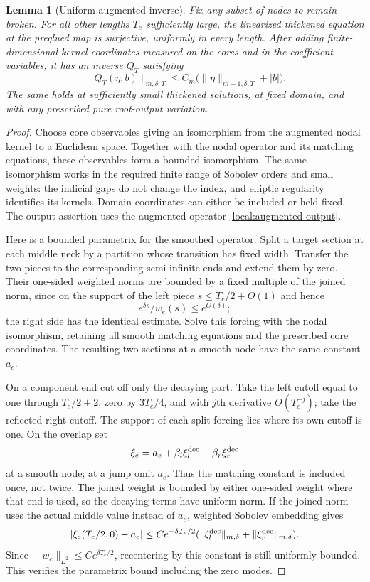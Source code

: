 \documentclass[11pt]{article}
\newtheorem{lemma}[theorem]{Lemma}
\theoremstyle{definition}
\theoremstyle{remark}
\numberwithin{equation}{section}
\begin{document}
\begin{lemma}[Uniform augmented inverse]\label{local:inverse}
Fix any subset of nodes to remain broken.  For all other lengths
$T_e$ sufficiently large, the linearized thickened equation at the
preglued map is surjective, uniformly in every length.  After adding
finite-dimensional kernel coordinates measured on the cores and in
the coefficient variables, it has an inverse $Q_T$ satisfying
\begin{equation}\label{local:inverse-estimate}
 \|Q_T(\eta,b)\|_{m,\delta,T}
       \leq C_m\bigl(\|\eta\|_{m-1,\delta,T}+|b|\bigr).
\end{equation}
The same holds at sufficiently small thickened solutions, at fixed
domain, and with any prescribed pure root-output variation.
\end{lemma}
\begin{proof}
Choose core observables giving an isomorphism from the augmented nodal
kernel to a Euclidean space.  Together with the nodal operator and its
matching equations, these observables form a bounded isomorphism.
The same isomorphism works in the required finite range of Sobolev
orders and small weights: the indicial gaps do not change the index,
and elliptic regularity identifies its kernels.  Domain coordinates
can either be included or held fixed.  The output assertion uses the
augmented operator \eqref{local:augmented-output}.

Here is a bounded parametrix for the smoothed operator.  Split a target
section at each middle neck by a partition whose transition has fixed
width.  Transfer the two pieces to the corresponding semi-infinite
ends and extend them by zero.  Their one-sided weighted norms are
bounded by a fixed multiple of the joined norm, since on the support
of the left piece $s\leq T_e/2+O(1)$ and hence
\[
 e^{\delta s}/w_e(s)\leq e^{O(\delta)};
\]
the right side has the identical estimate.  Solve this forcing with
the nodal isomorphism, retaining all smooth matching equations and
the prescribed core coordinates.  The resulting two sections at a
smooth node have the same constant $a_e$.

On a component end cut off only the decaying part.  Take the left
cutoff equal to one through $T_e/2+2$, zero by $3T_e/4$, and with
$j$th derivative $O(T_e^{-j})$; take the reflected right cutoff.
The support of each split forcing lies where its own cutoff is one.
On the overlap set
\begin{equation}\label{local:splice}
 \xi_e=a_e+\beta_l\xi_l^{\rm dec}
                  +\beta_r\xi_r^{\rm dec}
\end{equation}
at a smooth node; at a jump omit $a_e$.  Thus the matching constant
is included once, not twice.  The joined weight is bounded by either
one-sided weight where that end is used, so the decaying terms have
uniform norm.  If the joined norm uses the actual middle value
instead of $a_e$, weighted Sobolev embedding gives
\[
 |\xi_e(T_e/2,0)-a_e|
       \leq C e^{-\delta T_e/2}
                (\|\xi_l^{\rm dec}\|_{m,\delta}
                 +\|\xi_r^{\rm dec}\|_{m,\delta}).
\]
Since $\|w_e\|_{L^2}\leq Ce^{\delta T_e/2}$, recentering by this
constant is still uniformly bounded.  This verifies the parametrix
bound including the zero modes.


\end{proof}
\end{document}
